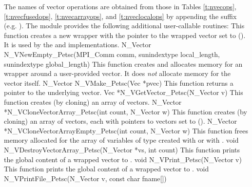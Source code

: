 The names of vector operations are obtained from those in 
Tables \ref{t:nvecops}, \ref{t:nvecfusedops}, \ref{t:nvecarrayops}, and
\ref{t:nveclocalops} by appending the
suffix  (e.g. ).
The module {\nvecpetsc}  provides the following additional user-callable routines:
{ 
  This function creates a new {\nvector} wrapper with the pointer to
  the wrapped {\petsc} vector set to (). It is used by the 
   and  implementations. 
}
{
  N\_Vector N\_VNewEmpty\_Petsc(MPI\_Comm comm, sunindextype local\_length, 
  sunindextype global\_length)
}
{  
  This function creates and allocates memory for an {\nvecpetsc}
  wrapper around a user-provided {\petsc} vector. It does {\em not} 
  allocate memory for the vector  itself.
}
{
  N\_Vector N\_VMake\_Petsc(Vec *pvec)
}
{  
  This function returns a pointer to the underlying {\petsc} vector.
}
{
  Vec *N\_VGetVector\_Petsc(N\_Vector v)
}
{ 
  This function creates (by cloning) an array of  {\nvecpetsc} vectors.
}
{
  N\_Vector *N\_VCloneVectorArray\_Petsc(int count, N\_Vector w)
}
{ 
  This function creates (by cloning) an array of  {\nvecpetsc} vectors,
  each with pointers to {\petsc} vectors set to ().
}
{
  N\_Vector *N\_VCloneVectorArrayEmpty\_Petsc(int count, N\_Vector w)
}
{
  This function frees memory allocated for the array of  variables of
  type  created with  or with
  .
}
{
  void N\_VDestroyVectorArray\_Petsc(N\_Vector *vs, int count)
}
{
  This function prints the global content of a wrapped {\petsc} vector to .
}
{
  void N\_VPrint\_Petsc(N\_Vector v)
}
{  
  This function prints the global content of a wrapped {\petsc} vector to .
}
{
  void N\_VPrintFile\_Petsc(N\_Vector v, const char fname[])
}

